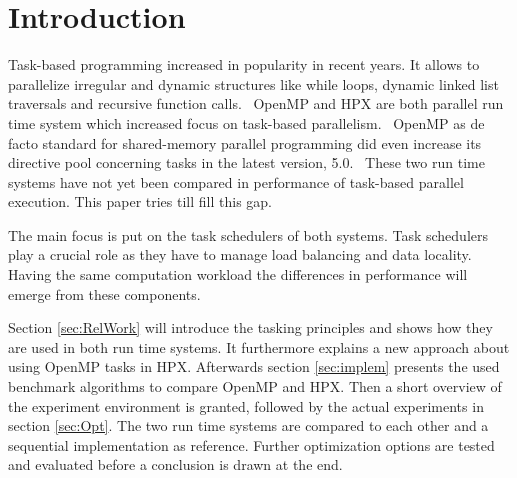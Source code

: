 \section{Introduction}
  Task-based programming increased in popularity in recent years.
  It allows to parallelize irregular and dynamic structures like while loops, dynamic linked list traversals and recursive function calls.~\cite{Ayguade.2009}
  OpenMP and HPX are both parallel run time system which increased focus on task-based parallelism.~\cite{TheSTEARGroup.2020}
  OpenMP as de facto standard for shared-memory parallel programming did even increase its directive pool concerning tasks in the latest version, 5.0.~\cite{Zhang.2192020}
  These two run time systems have not yet been compared in performance of task-based parallel execution.
  This paper tries till fill this gap.
  
  The main focus is put on the task schedulers of both systems.
  Task schedulers play a crucial role as they have to manage load balancing and data locality.
  Having the same computation workload the differences in performance will emerge from these components.~\cite{Qawasmeh.2014}
  
  Section \ref{sec:RelWork} will introduce the tasking principles and shows how they are used in both run time systems.
  It furthermore explains a new approach about using OpenMP tasks in HPX.
  Afterwards section \ref{sec:implem} presents the used benchmark algorithms to compare OpenMP and HPX.
  Then a short overview of the experiment environment is granted, followed by the actual experiments in section \ref{sec:Opt}.
  The two run time systems are compared to each other and a sequential implementation as reference.
  Further optimization options are tested and evaluated before a conclusion is drawn at the end.